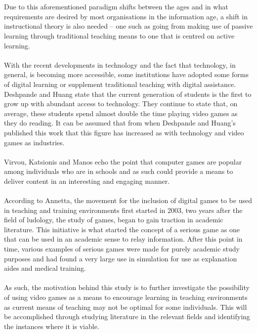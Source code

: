 \documentclass[conference]{IEEEtran}
\begin{document}
\\\\
Due to this aforementioned paradigm shifts between the ages and in what requirements are desired by most organisations in the information age, a shift in instructional theory is also needed – one such as going from making use of passive learning through traditional teaching means to one that is centred on active learning\cite{Reigeluth1996}.
\\\\
With the recent developments in technology and the fact that technology, in general, is becoming more accessible, some institutions have adopted some forms of digital learning or supplement traditional teaching with digital assistance. Deshpande and Huang\cite{Deshpande2011} state that the current generation of students is the first to grow up with abundant access to technology. They continue to state that, on average, these students spend almost double the time playing video games as they do reading\cite{Deshpande2011}. It can be assumed that from when Deshpande and Huang’s\cite{Deshpande2011} published this work that this figure has increased as with technology and video games as industries. 
\\\\
Virvou, Katsionis and Manos\cite{Virvou2005} echo the point that computer games are popular among individuals who are in schools and as such could provide a means to deliver content in an interesting and engaging manner. 
\\\\
According to Annetta\cite{Annetta2008}, the movement for the inclusion of digital games to be used in teaching and training environments first started in 2003, two years after the field of ludology, the study of games, began to gain traction in academic literature. This initiative is what started the concept of a serious game as one that can be used in an academic sense to relay information. After this point in time, various examples of serious games were made for purely academic study purposes and had found a very large use in simulation for use as explanation aides and medical training.
\\\\
As such, the motivation behind this study is to further investigate the possibility of using video games as a means to encourage learning in teaching environments as current means of teaching may not be optimal for some individuals. This will be accomplished through studying literature in the relevant fields and identifying the instances where it is viable.
 
\end{document}

